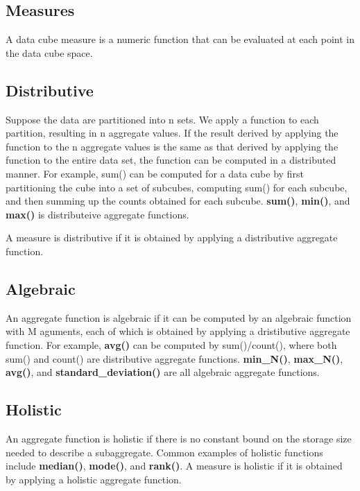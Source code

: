 	\subsection{Measures}

		A data cube measure is a numeric function that can be evaluated at each point in the
		data cube space. 

		\subsection*{Distributive} 
		
		Suppose the data are partitioned into n sets. We apply a 
		function to each partition, resulting in n aggregate values. If the result
		derived by applying the function to the n aggregate values is the same as that 
		derived by applying the function to the entire data set, the function can be
		computed in a distributed manner. For example, sum() can be computed for 
		a data cube by first partitioning the cube into a set of subcubes, computing 
		sum() for each subcube, and then summing up the counts obtained for each subcube. 
		{\bf sum()}, {\bf min()}, and {\bf max()} is distributeive aggregate functions.

		A measure is distributive if it is obtained by applying a distributive aggregate
		function. 

		\subsection*{Algebraic} 

		An aggregate function is algebraic if it can be computed by an algebraic function
		with M aguments, each of which is obtained by applying a dristibutive aggregate function.
		For example, {\bf avg()} can be computed by sum()/count(), where both sum() and 
		count() are distributive aggregate functions. 
		{\bf min\_N()}, {\bf max\_N()}, {\bf avg()}, and {\bf standard\_deviation()} are all 
		algebraic aggregate functions. 

		\subsection*{Holistic}

		An aggregate function is  holistic if there is no constant bound on the storage
		size needed to describe a subaggregate. Common examples of holistic functions include
		{\bf median()}, {\bf mode()}, and {\bf rank()}.
		A measure is holistic if it is obtained by applying a holistic aggregate function. 

